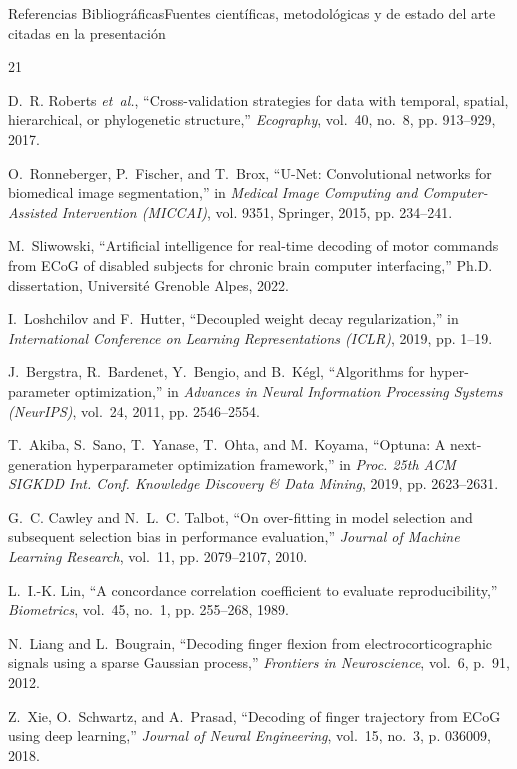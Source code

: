 \begin{frame}[allowframebreaks]{Referencias Bibliogr\'aficas}{Fuentes cient\'ificas, metodol\'ogicas y de estado del arte citadas en la presentaci\'on}
\begin{thebibliography}{21}
    \framebreak

    D.~R. Roberts \emph{et~al.}, ``Cross-validation strategies for data with temporal, spatial, hierarchical, or phylogenetic structure,'' \emph{Ecography}, vol.~40, no.~8, pp. 913--929, 2017.

    O.~Ronneberger, P.~Fischer, and T.~Brox, ``{U-Net}: Convolutional networks for biomedical image segmentation,'' in \emph{Medical Image Computing and Computer-Assisted Intervention ({MICCAI})}, vol. 9351, Springer, 2015, pp. 234--241.

    M.~Sliwowski, ``Artificial intelligence for real-time decoding of motor commands from {ECoG} of disabled subjects for chronic brain computer interfacing,'' Ph.D. dissertation, Universit\'e Grenoble Alpes, 2022.

    I.~Loshchilov and F.~Hutter, ``Decoupled weight decay regularization,'' in \emph{International Conference on Learning Representations ({ICLR})}, 2019, pp. 1--19.

    J.~Bergstra, R.~Bardenet, Y.~Bengio, and B.~K\'egl, ``Algorithms for hyper-parameter optimization,'' in \emph{Advances in Neural Information Processing Systems ({NeurIPS})}, vol.~24, 2011, pp. 2546--2554.

    T.~Akiba, S.~Sano, T.~Yanase, T.~Ohta, and M.~Koyama, ``{Optuna}: A next-generation hyperparameter optimization framework,'' in \emph{Proc. 25th ACM SIGKDD Int. Conf. Knowledge Discovery \& Data Mining}, 2019, pp. 2623--2631.

    G.~C. Cawley and N.~L.~C. Talbot, ``On over-fitting in model selection and subsequent selection bias in performance evaluation,'' \emph{Journal of Machine Learning Research}, vol.~11, pp. 2079--2107, 2010.

    \framebreak

    L.~I.-K. Lin, ``A concordance correlation coefficient to evaluate reproducibility,'' \emph{Biometrics}, vol.~45, no.~1, pp. 255--268, 1989.

    N.~Liang and L.~Bougrain, ``Decoding finger flexion from electrocorticographic signals using a sparse {G}aussian process,'' \emph{Frontiers in Neuroscience}, vol.~6, p.~91, 2012.

    Z.~Xie, O.~Schwartz, and A.~Prasad, ``Decoding of finger trajectory from {ECoG} using deep learning,'' \emph{Journal of Neural Engineering}, vol.~15, no.~3, p. 036009, 2018.


\end{thebibliography}
\end{frame}
